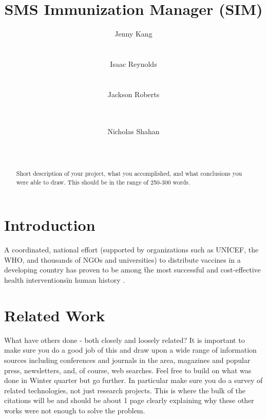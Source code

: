 \documentclass{acm_proc_article-sp}
\begin{document}
\title{SMS Immunization Manager (SIM)}

\author{
       \alignauthor
       Jenny Kang\\
              \\
              \\
       \alignauthor
       Isaac Reynolds\\
              \\
              \\
       \alignauthor 
       Jackson Roberts\\
              \\
              \\
       \and 
       \alignauthor 
       Nicholas Shahan\\
              \\
              \\
}

\maketitle
\begin{abstract}
Short description of your project, what you accomplished, and what conclusions 
you were able to draw. This should be in the range of 250-300 words.
\end{abstract}

\section{Introduction}
A coordinated, national effort (supported by organizations such as UNICEF, the WHO, and thousands of NGOs and universities) to distribute vaccines in a developing country has proven to be among \"the most successful and cost-effective health interventions\" in human history \citep{who:campaign_essentials}.

\section{Related Work}
What have others done - both closely and loosely related?  It is important to make sure you do a good job of this and draw upon a wide range of information sources including conferences and journals in the area, magazines and popular press, newsletters, and, of course, web searches.  Feel free to build on what was done in Winter quarter but go further.  In particular make sure you do a survey of related technologies, not just research projects.  This is where the bulk of the citations will be and should be about 1 page clearly explaining why these other works were not enough to solve the problem.
\end{document}
